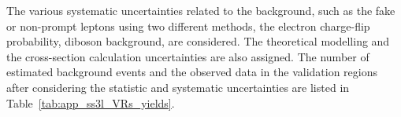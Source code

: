 The various systematic uncertainties related to the background, such as the fake or non-prompt leptons using two different methods, the electron charge-flip probability, diboson background, are considered.
The theoretical modelling and the cross-section calculation uncertainties are also assigned.
The number of estimated background events and the observed data in the validation regions after considering the statistic and systematic uncertainties are listed in Table~\ref{tab:app_ss3l_VRs_yields}.

\begin{table}[htb]
\end{table}
